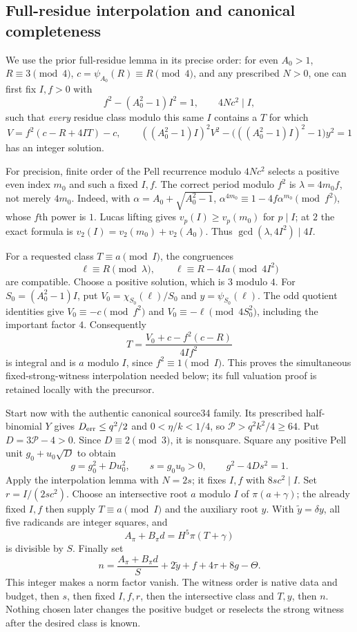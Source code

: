 \subsection{Full-residue interpolation and canonical completeness}

We use the prior full-residue lemma in its precise order: for even
$A_0>1$, $R\equiv3\pmod4$, $c=\psi_{A_0}(R)\equiv R\pmod4$, and
any prescribed $N>0$, one can first fix $I,f>0$ with
\[
 f^2-(A_0^2-1)I^2=1,\qquad 4Nc^2\mid I,
\]
such that \emph{every} residue class modulo this same $I$ contains a
$T$ for which
\[
 V=f^2(c-R+4IT)-c,\qquad
 ((A_0^2-1)I)^2V^2-
 \bigl(((A_0^2-1)I)^2-1\bigr)y^2=1
\]
has an integer solution.

For precision, finite order of the Pell recurrence modulo $4Nc^2$
selects a positive even index $m_0$ and such a fixed $I,f$.
The correct period modulo $f^2$ is $\lambda=4m_0f$, not merely
$4m_0$. Indeed, with $\alpha=A_0+\sqrt{A_0^2-1}$,
$\alpha^{4m_0}\equiv1-4f\alpha^{m_0}\pmod{f^2}$, whose $f$th power
is $1$. Lucas lifting gives $v_p(I)\ge v_p(m_0)$ for $p\mid I$;
at $2$ the exact formula is $v_2(I)=v_2(m_0)+v_2(A_0)$.
Thus $\gcd(\lambda,4I^2)\mid4I$.

For a requested class $T\equiv a\pmod I$, the congruences
\[
 \ell\equiv R\pmod\lambda,\qquad
 \ell\equiv R-4Ia\pmod{4I^2}
\]
are compatible. Choose a positive solution, which is $3$ modulo $4$.
For $S_0=(A_0^2-1)I$, put
$V_0=\chi_{S_0}(\ell)/S_0$ and $y=\psi_{S_0}(\ell)$.
The odd quotient identities give
$V_0\equiv-c\pmod{f^2}$ and
$V_0\equiv-\ell\pmod{4S_0^2}$, including the important factor $4$.
Consequently
\[
 T=\frac{V_0+c-f^2(c-R)}{4If^2}
\]
is integral and is $a$ modulo $I$, since $f^2\equiv1\pmod I$.
This proves the simultaneous fixed-strong-witness interpolation needed
below; its full valuation proof is retained locally with the precursor.

Start now with the authentic canonical source34 family. Its prescribed
half-binomial $Y$ gives
$D_{\rm err}\le q^2/2$ and $0<\eta/k<1/4$, so
$\mathcal P>q^2k^2/4\ge64$. Put $D=3\mathcal P-4>0$.
Since $D\equiv2\pmod3$, it is nonsquare. Square any positive Pell
unit $g_0+u_0\sqrt D$ to obtain
\[
 g=g_0^2+Du_0^2,\qquad s=g_0u_0>0,
 \qquad g^2-4Ds^2=1.
\]
Apply the interpolation lemma with $N=2s$; it fixes $I,f$ with
$8sc^2\mid I$. Set $r=I/(2sc^2)$. Choose an intersective root
$a$ modulo $I$ of $\pi(a+\gamma)$; the already fixed $I,f$ then
supply $T\equiv a\pmod I$ and the auxiliary root $y$.
With $\widetilde y=\delta y$, all five radicands are integer squares,
and
\[
 A_\pi+B_\pi d=H^5\pi(T+\gamma)
\]
is divisible by $S$. Finally set
\[
 n=\frac{A_\pi+B_\pi d}{S}
        +2\widetilde y+f+4\tau+8g-\Theta.
\]
This integer makes a norm factor vanish. The witness order is native
data and budget, then $s$, then fixed $I,f,r$, then the intersective
class and $T,y$, then $n$. Nothing chosen later changes the positive
budget or reselects the strong witness after the desired class is known.

